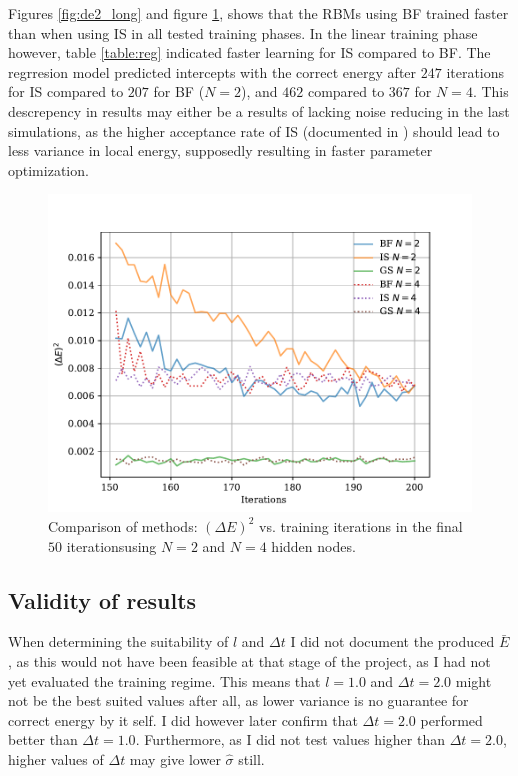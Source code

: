 \documentclass[%
oneside,                 %
final,                   %
10pt]{article}
\begin{document}
Figures \ref{fig:de2_long} and figure \ref{fig:de2_last}, shows that the RBMs using BF trained faster than when using IS in all tested training phases. In the linear training phase however, table \ref{table:reg} indicated faster learning for IS compared to BF. The regrresion model predicted intercepts with the correct energy after $247$ iterations for IS compared to $207$ for BF ($N=2$), and $462$ compared to $367$ for $N=4$. This descrepency in results may either be a results of lacking noise reducing in the last simulations, as the higher acceptance rate of IS (documented in \cite{JN_P1}) should lead to less variance in local energy, supposedly resulting in faster parameter optimization.
\begin{figure}[H]
        \centering 
         \includegraphics[scale=0.8]{../Results/sim_15/ns_interacting_de2.pdf} 
        \caption{Comparison of methods: $(\Delta E)^2$ vs. training iterations in the final $50$ iterationsusing $N=2$ and $N=4$ hidden nodes.}
        \label{fig:de2_last}   
\end{figure}  


\subsection{Validity of results}
When determining the suitability of $l$ and $\Delta t$ I did not document the produced $\bar E$, as this would not have been feasible at that stage of the project, as I had not yet evaluated the training regime. This means that $l=1.0$ and $\Delta t=2.0$ might not be the best suited values after all, as lower variance is no guarantee for correct energy by it self. I did however later confirm that $\Delta t=2.0$ performed better than $\Delta t=1.0$. Furthermore, as I did not test values higher than $\Delta t=2.0$, higher values of $\Delta t$ may give lower $\hat \sigma$ still. 
\end{document}
